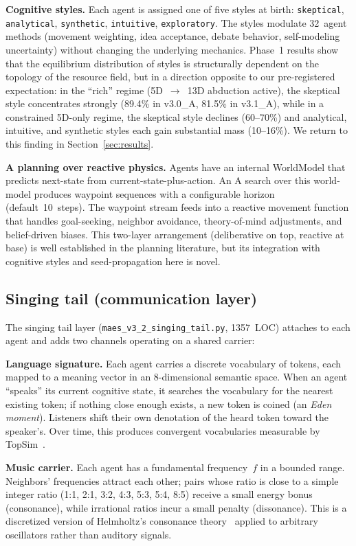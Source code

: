 \documentclass[11pt,a4paper]{article}
\begin{document}
\textbf{Cognitive styles.} Each agent is assigned one of five styles at
birth: \texttt{skeptical}, \texttt{analytical}, \texttt{synthetic},
\texttt{intuitive}, \texttt{exploratory}. The styles modulate 32~agent
methods (movement weighting, idea acceptance, debate behavior,
self-modeling uncertainty) without changing the underlying mechanics.
Phase~1 results show that the equilibrium distribution of styles is
structurally dependent on the topology of the resource field, but in a
direction opposite to our pre-registered expectation: in the
``rich'' regime (5D~$\rightarrow$~13D abduction active), the skeptical
style concentrates strongly (89.4\% in v3.0\_A, 81.5\% in v3.1\_A),
while in a constrained 5D-only regime, the skeptical style declines
(60--70\%) and analytical, intuitive, and synthetic styles each gain
substantial mass (10--16\%). We return to this finding in Section~\ref{sec:results}.

\textbf{A\* planning over reactive physics.} Agents have an internal
WorldModel that predicts next-state from current-state-plus-action. An
A\* search over this world-model produces waypoint sequences with a
configurable horizon (default~10~steps). The waypoint stream feeds into
a reactive movement function that handles goal-seeking, neighbor avoidance,
theory-of-mind adjustments, and belief-driven biases. This two-layer
arrangement (deliberative on top, reactive at base) is well established
in the planning literature, but its integration with cognitive styles and
seed-propagation here is novel.

\subsection{Singing tail (communication layer)}

The singing tail layer (\texttt{maes\_v3\_2\_singing\_tail.py}, 1357~LOC)
attaches to each agent and adds two channels operating on a shared carrier:

\textbf{Language signature.} Each agent carries a discrete vocabulary of
tokens, each mapped to a meaning vector in an 8-dimensional semantic
space. When an agent ``speaks'' its current cognitive state, it searches
the vocabulary for the nearest existing token; if nothing close enough
exists, a new token is coined (an \emph{Eden moment}). Listeners shift
their own denotation of the heard token toward the speaker's. Over time,
this produces convergent vocabularies measurable by TopSim~\cite{brighton2006topsim}.

\textbf{Music carrier.} Each agent has a fundamental frequency~$f$ in a
bounded range. Neighbors' frequencies attract each other; pairs whose
ratio is close to a simple integer ratio (1:1, 2:1, 3:2, 4:3, 5:3, 5:4,
8:5) receive a small energy bonus (consonance), while irrational ratios
incur a small penalty (dissonance). This is a discretized version of
Helmholtz's consonance theory~\cite{helmholtz1863} applied to arbitrary
oscillators rather than auditory signals.
\end{document}
